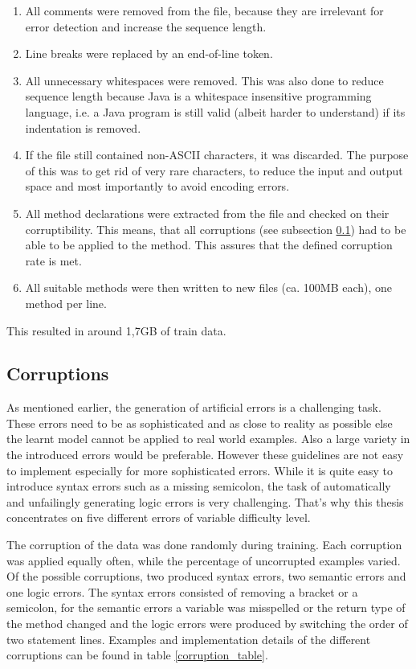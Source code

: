 \begin{enumerate}
  \item All comments were removed from the file, because they are irrelevant for error detection and increase the sequence length.
  \item Line breaks were replaced by an end-of-line token.
  \item All unnecessary whitespaces were removed. This was also done to reduce sequence length because Java is a whitespace insensitive programming language, i.e. a Java program is still valid (albeit harder to understand) if its indentation is removed.
  \item If the file still contained non-ASCII characters, it was discarded. The purpose of this was to get rid of very rare characters, to reduce the input and output space and most importantly to avoid encoding errors.
  \item All method declarations were extracted from the file and checked on their corruptibility. This means, that all corruptions (see subsection \ref{corruption}) had to be able to be applied to the method. This assures that the defined corruption rate is met.
  \item All suitable methods were then written to new files (ca. 100MB each), one method per line.
\end{enumerate}

This resulted in around 1,7GB of train data.

\subsection{Corruptions}
\label{corruption}

As mentioned earlier, the generation of artificial errors is a challenging task. These errors need to be as sophisticated and as close to reality as possible else the learnt model cannot be applied to real world examples. Also a large variety in the introduced errors would be preferable. However these guidelines are not easy to implement especially for more sophisticated errors. While it is quite easy to introduce syntax errors such as a missing semicolon, the task of automatically and unfailingly generating logic errors is very challenging. That's why this thesis concentrates on five different errors of variable difficulty level.

The corruption of the data was done randomly during training. Each corruption was applied equally often, while the percentage of uncorrupted examples varied. Of the possible corruptions, two produced syntax errors, two semantic errors and one logic errors. The syntax errors consisted of removing a bracket or a semicolon, for the semantic errors a variable was misspelled or the return type of the method changed and the logic errors were produced by switching the order of two statement lines. Examples and implementation details of the different corruptions can be found in table \ref{corruption_table}.

